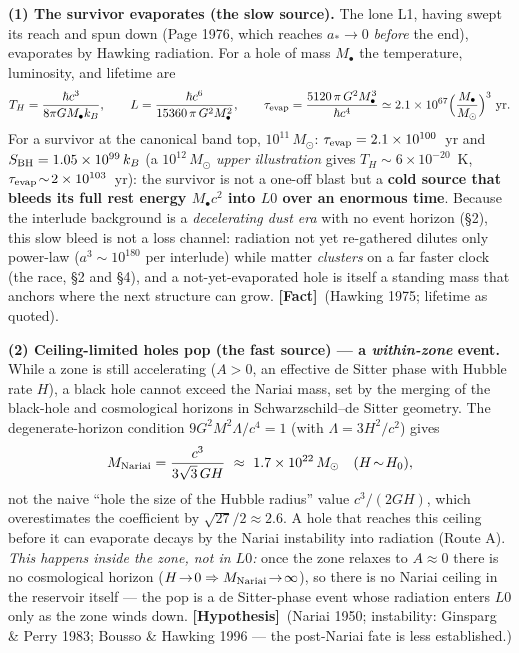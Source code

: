 \documentclass[11pt]{article}
\newcommand{\Fact}{\textbf{\textcolor{green!45!black}{[Fact]}}}
\newcommand{\Hyp}{\textbf{\textcolor{blue!55!black}{[Hypothesis]}}}
\newcommand{\msun}{M_\odot}
\newcommand{\Mbh}{M_{\bullet}}
\begin{document}
\textbf{(1) The survivor evaporates (the slow source).} The lone L1, having swept its reach and spun down (Page 1976, which reaches $a_\ast\!\to\!0$ \emph{before} the end), evaporates by Hawking radiation. For a hole of mass $\Mbh$ the temperature, luminosity, and lifetime are
\begin{equation}
T_H=\frac{\hbar c^3}{8\pi G \Mbh k_B},\qquad
L=\frac{\hbar c^6}{15360\,\pi\,G^2 \Mbh^2},\qquad
\tau_{\rm evap}=\frac{5120\,\pi\,G^2 \Mbh^3}{\hbar c^4}\simeq 2.1\times10^{67}\Big(\frac{\Mbh}{\msun}\Big)^{3}\ {\rm yr}.
\label{eq:hawking}
\end{equation}
For a survivor at the canonical band top, $10^{11}\,\msun$: $\tau_{\rm evap}=2.1\times10^{100}$~yr and $S_{\rm BH}=1.05\times10^{99}\,k_B$ (a $10^{12}\,\msun$ \emph{upper illustration} gives $T_H\!\sim\!6\times10^{-20}$~K, $\tau_{\rm evap}\!\sim\!2\times10^{103}$~yr): the survivor is not a one-off blast but a \textbf{cold source that bleeds its full rest energy $\Mbh c^2$ into $L0$ over an enormous time}. Because the interlude background is a \emph{decelerating dust era} with no event horizon (\S2), this slow bleed is not a loss channel: radiation not yet re-gathered dilutes only power-law ($a^3\sim10^{180}$ per interlude) while matter \emph{clusters} on a far faster clock (the race, \S2 and \S4), and a not-yet-evaporated hole is itself a standing mass that anchors where the next structure can grow. \Fact\ (Hawking 1975; lifetime as quoted).

\textbf{(2) Ceiling-limited holes pop (the fast source) --- a \emph{within-zone} event.} While a zone is still accelerating ($A>0$, an effective de Sitter phase with Hubble rate $H$), a black hole cannot exceed the Nariai mass, set by the merging of the black-hole and cosmological horizons in Schwarzschild--de Sitter geometry. The degenerate-horizon condition $9G^2M^2\Lambda/c^4=1$ (with $\Lambda=3H^2/c^2$) gives
\begin{equation}
M_{\rm Nariai}=\frac{c^3}{3\sqrt3\,G H}\ \approx\ 1.7\times10^{22}\,\msun\quad(H\!\sim\!H_0),
\label{eq:nariai}
\end{equation}
not the naive ``hole the size of the Hubble radius'' value $c^3/(2GH)$, which overestimates the coefficient by $\sqrt{27}/2\!\approx\!2.6$. A hole that reaches this ceiling before it can evaporate decays by the Nariai instability into radiation (Route A). \emph{This happens inside the zone, not in $L0$:} once the zone relaxes to $A\!\approx\!0$ there is no cosmological horizon ($H\!\to\!0\Rightarrow M_{\rm Nariai}\!\to\!\infty$), so there is no Nariai ceiling in the reservoir itself --- the pop is a de Sitter-phase event whose radiation enters $L0$ only as the zone winds down. \Hyp\ (Nariai 1950; instability: Ginsparg \& Perry 1983; Bousso \& Hawking 1996 --- the post-Nariai fate is less established.)
\end{document}
